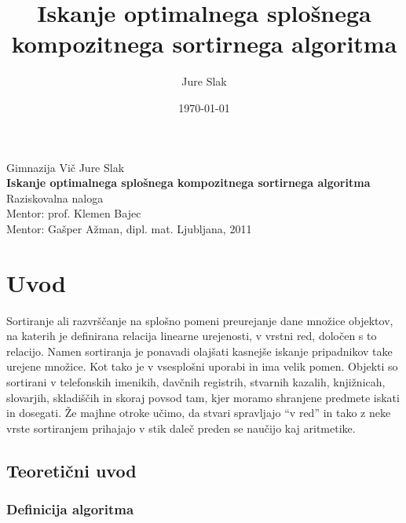 \documentclass[a4paper,oneside]{article}
\title{Iskanje optimalnega splošnega kompozitnega sortirnega algoritma}
\author{Jure Slak}
\date{\today}
\begin{document}
\addto\captionsslovene {
\renewcommand\bibname{}
}
\renewcommand\refname{}


\thispagestyle{empty}

\begin{center}{\large
  Gimnazija Vič
  \vfill
  Jure Slak\\[2mm]
  {\bf Iskanje optimalnega splošnega kompozitnega sortirnega algoritma}\\[10mm]
  Raziskovalna naloga\\[1cm]
  Mentor: prof. Klemen Bajec \\[2mm]
  Mentor: Gašper Ažman, dipl. mat.}
  \vfill
  \vfill
  \large Ljubljana, 2011
\end{center}
\pagebreak

\thispagestyle{empty}
\tableofcontents
\pagebreak

\section{Uvod}

Sortiranje ali razvrščanje na splošno pomeni preurejanje dane množice objektov, na katerih
je definirana relacija linearne urejenosti, v vrstni red, določen s to relacijo.
Namen sortiranja je ponavadi olajšati kasnejše iskanje pripadnikov take urejene množice. Kot tako je
v vsesplošni uporabi in ima velik pomen. Objekti so sortirani v telefonskih imenikih,
davčnih registrih, stvarnih kazalih, knjižnicah, slovarjih, skladiščih in skoraj povsod tam,
kjer moramo shranjene predmete iskati in dosegati. Že majhne otroke učimo, da stvari spravljajo
``v red'' in tako z neke vrste sortiranjem prihajajo v stik daleč preden se naučijo kaj
aritmetike.

\subsection{Teoretični uvod}



\subsubsection{Definicija algoritma}
\end{document}
